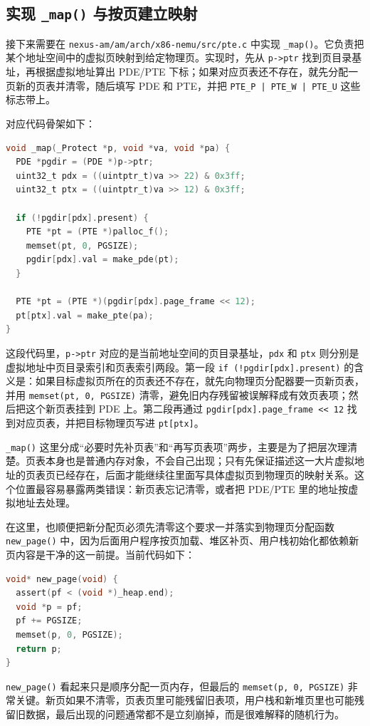 \documentclass[a4paper]{article}
\begin{document}
\subsection{实现 \texttt{\_map()} 与按页建立映射}
接下来需要在 \texttt{nexus-am/am/arch/x86-nemu/src/pte.c} 中实现 \texttt{\_map()}。它负责把某个地址空间中的虚拟页映射到给定物理页。实现时，先从 \texttt{p->ptr} 找到页目录基址，再根据虚拟地址算出 PDE/PTE 下标；如果对应页表还不存在，就先分配一页新的页表并清零，随后填写 PDE 和 PTE，并把 \texttt{PTE\_P | PTE\_W | PTE\_U} 这些标志带上。

对应代码骨架如下：
\begin{lstlisting}[language=C]
void _map(_Protect *p, void *va, void *pa) {
  PDE *pgdir = (PDE *)p->ptr;
  uint32_t pdx = ((uintptr_t)va >> 22) & 0x3ff;
  uint32_t ptx = ((uintptr_t)va >> 12) & 0x3ff;

  if (!pgdir[pdx].present) {
    PTE *pt = (PTE *)palloc_f();
    memset(pt, 0, PGSIZE);
    pgdir[pdx].val = make_pde(pt);
  }

  PTE *pt = (PTE *)(pgdir[pdx].page_frame << 12);
  pt[ptx].val = make_pte(pa);
}
\end{lstlisting}

这段代码里，\texttt{p->ptr} 对应的是当前地址空间的页目录基址，\texttt{pdx} 和 \texttt{ptx} 则分别是虚拟地址中页目录索引和页表索引两段。第一段 \texttt{if (!pgdir[pdx].present)} 的含义是：如果目标虚拟页所在的页表还不存在，就先向物理页分配器要一页新页表，并用 \texttt{memset(pt, 0, PGSIZE)} 清零，避免旧内存残留被误解释成有效页表项；然后把这个新页表挂到 PDE 上。第二段再通过 \texttt{pgdir[pdx].page\_frame << 12} 找到对应页表，并把目标物理页写进 \texttt{pt[ptx]}。

\texttt{\_map()} 这里分成“必要时先补页表”和“再写页表项”两步，主要是为了把层次理清楚。页表本身也是普通内存对象，不会自己出现；只有先保证描述这一大片虚拟地址的页表页已经存在，后面才能继续往里面写具体虚拟页到物理页的映射关系。这个位置最容易暴露两类错误：新页表忘记清零，或者把 PDE/PTE 里的地址按虚拟地址去处理。

在这里，也顺便把新分配页必须先清零这个要求一并落实到物理页分配函数 \texttt{new\_page()} 中，因为后面用户程序按页加载、堆区补页、用户栈初始化都依赖新页内容是干净的这一前提。当前代码如下：
\begin{lstlisting}[language=C]
void* new_page(void) {
  assert(pf < (void *)_heap.end);
  void *p = pf;
  pf += PGSIZE;
  memset(p, 0, PGSIZE);
  return p;
}
\end{lstlisting}

\texttt{new\_page()} 看起来只是顺序分配一页内存，但最后的 \texttt{memset(p, 0, PGSIZE)} 非常关键。新页如果不清零，页表页里可能残留旧表项，用户栈和新堆页里也可能残留旧数据，最后出现的问题通常都不是立刻崩掉，而是很难解释的随机行为。
\end{document}
